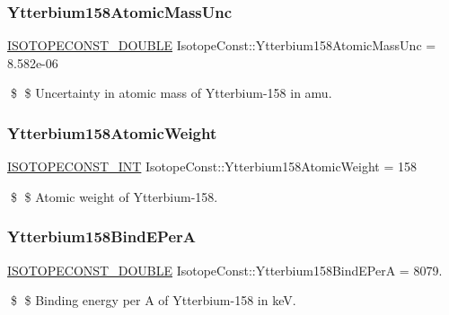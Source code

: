 \subsubsection{\texorpdfstring{Ytterbium158\+Atomic\+Mass\+Unc}{Ytterbium158AtomicMassUnc}}
{\footnotesize\ttfamily \mbox{\hyperlink{group___isotope_const-_macros_ga8f45a7272ce02c0b4c65c44636ed719a}{I\+S\+O\+T\+O\+P\+E\+C\+O\+N\+S\+T\+\_\+\+D\+O\+U\+B\+LE}} Isotope\+Const\+::\+Ytterbium158\+Atomic\+Mass\+Unc = 8.\+582e-\/06}

\$ \$ Uncertainty in atomic mass of Ytterbium-\/158 in amu. \mbox{\label{group___isotope_const-_ytterbium-_yb158_ga57181cdedfb3072c5338e4d2afb1d1c9}} 
\subsubsection{\texorpdfstring{Ytterbium158\+Atomic\+Weight}{Ytterbium158AtomicWeight}}
{\footnotesize\ttfamily \mbox{\hyperlink{group___isotope_const-_macros_ga5f18360b3e99483a35c32d789e62621c}{I\+S\+O\+T\+O\+P\+E\+C\+O\+N\+S\+T\+\_\+\+I\+NT}} Isotope\+Const\+::\+Ytterbium158\+Atomic\+Weight = 158}

\$ \$ Atomic weight of Ytterbium-\/158. \mbox{\label{group___isotope_const-_ytterbium-_yb158_gaa715b64ca46a6821844425c49da5cff9}} 
\subsubsection{\texorpdfstring{Ytterbium158\+Bind\+E\+PerA}{Ytterbium158BindEPerA}}
{\footnotesize\ttfamily \mbox{\hyperlink{group___isotope_const-_macros_ga8f45a7272ce02c0b4c65c44636ed719a}{I\+S\+O\+T\+O\+P\+E\+C\+O\+N\+S\+T\+\_\+\+D\+O\+U\+B\+LE}} Isotope\+Const\+::\+Ytterbium158\+Bind\+E\+PerA = 8079.}

\$ \$ Binding energy per A of Ytterbium-\/158 in keV. \mbox{\label{group___isotope_const-_ytterbium-_yb158_gad8cd94648b025cd7f94035abeeba1f11}} 
